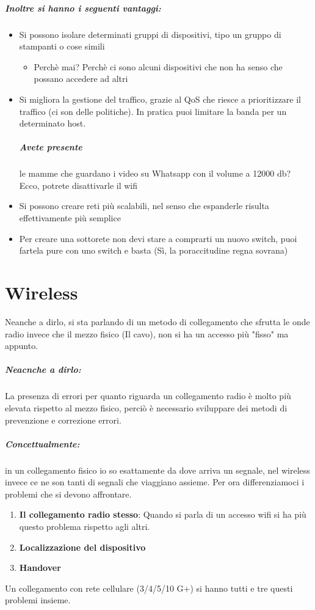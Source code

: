 \documentclass[12pt, a4paper, openany, twoside]{book}
\begin{document}
\paragraph{Inoltre si hanno i seguenti vantaggi:}
\begin{itemize}
	\item Si possono isolare determinati gruppi di dispositivi, tipo un gruppo 
	di stampanti o cose simili
	\begin{itemize}
		\item Perchè mai? Perchè ci sono alcuni dispositivi che non ha senso che 
		possano accedere ad altri
	\end{itemize}
	\item Si migliora la gestione del traffico, grazie al QoS che riesce a 
	prioritizzare il traffico (ci son delle politiche). In pratica puoi limitare
	la banda per un determinato host. 
	\paragraph{Avete presente} le mamme che guardano i video su Whatsapp con il 
	volume a 12000 db? Ecco, potrete disattivarle il wifi 
	\item Si possono creare reti più scalabili, nel senso che espanderle risulta
	effettivamente più semplice
	\item Per creare una sottorete non devi stare a comprarti un nuovo switch, 
	puoi fartela pure con uno switch e basta (Sì, la poraccitudine regna sovrana)
\end{itemize}
\chapter{Wireless}
Neanche a dirlo, si sta parlando di un metodo di collegamento che sfrutta le 
onde radio invece che il mezzo fisico (Il cavo), non si ha un accesso più "fisso"
ma appunto. 
\paragraph{Neacnche a dirlo: }La presenza di errori per quanto riguarda un 
collegamento radio è molto più elevata rispetto al mezzo fisico, perciò è 
necessario sviluppare dei metodi di prevenzione e correzione errori.
\paragraph{Concettualmente: }in un collegamento fisico io so esattamente da 
dove arriva un segnale, nel wireless invece ce ne son tanti di segnali che 
viaggiano assieme. Per ora differenziamoci i problemi che si devono affrontare.
\begin{enumerate}
	\item \textbf{Il collegamento radio stesso}: Quando si  parla di un accesso 
	wifi si ha più questo problema rispetto agli altri.
	\item \textbf{Localizzazione del dispositivo} 
	\item \textbf{Handover}
\end{enumerate}
Un collegamento con rete cellulare (3/4/5/10 G+) si hanno tutti e tre questi 
problemi insieme.
\end{document}
